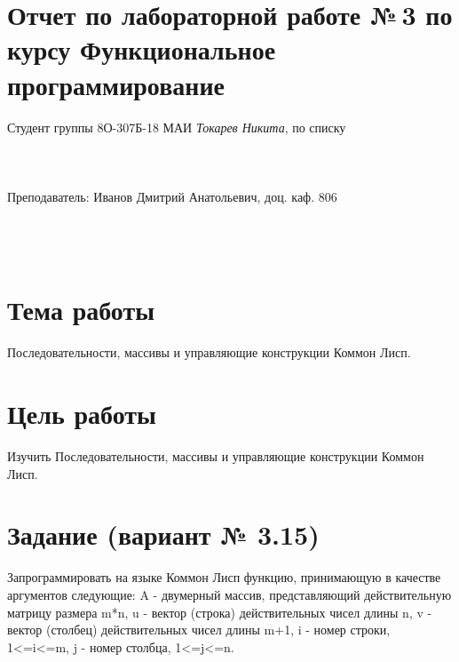 \documentclass[12pt]{article}
\begin{document}
\section*{Отчет по лабораторной работе №\,3 
по курсу \guillemotleft  Функциональное программирование\guillemotright}
\begin{flushright}
Студент группы 8О-307Б-18 МАИ \textit{Токарев Никита},  по списку \\
 \\
 \\
\ \\
Преподаватель: Иванов Дмитрий Анатольевич, доц. каф. 806 \\
 \\
 \\
 \\

\end{flushright}

\section{Тема работы}
Последовательности, массивы и управляющие конструкции Коммон Лисп.

\section{Цель работы}
Изучить  Последовательности, массивы и управляющие конструкции Коммон Лисп.

\section{Задание (вариант № 3.15)}
Запрограммировать на языке Коммон Лисп функцию, принимающую в качестве аргументов следующие:\newline
    A - двумерный массив, представляющий действительную матрицу размера m*n,\newline
    u - вектор (строка) действительных чисел длины n,\newline
    v - вектор (столбец) действительных чисел длины m+1,\newline
    i - номер строки, 1<=i<=m,\newline
    j - номер столбца, 1<=j<=n.\newline
\end{document}
